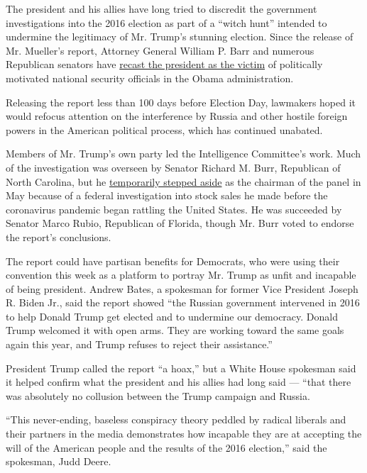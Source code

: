 The president and his allies have long tried to discredit the government
investigations into the 2016 election as part of a ``witch hunt''
intended to undermine the legitimacy of Mr. Trump's stunning election.
Since the release of Mr. Mueller's report, Attorney General William P.
Barr and numerous Republican senators have
\href{https://www.nytimes3xbfgragh.onion/2020/06/04/us/politics/republicans-senate-trump-russia.html}{recast
the president as the victim} of politically motivated national security
officials in the Obama administration.

Releasing the report less than 100 days before Election Day, lawmakers
hoped it would refocus attention on the interference by Russia and other
hostile foreign powers in the American political process, which has
continued unabated.

Members of Mr. Trump's own party led the Intelligence Committee's work.
Much of the investigation was overseen by Senator Richard M. Burr,
Republican of North Carolina, but he
\href{https://www.nytimes3xbfgragh.onion/2020/05/14/us/politics/richard-burr-stocks.html}{temporarily
stepped aside} as the chairman of the panel in May because of a federal
investigation into stock sales he made before the coronavirus pandemic
began rattling the United States. He was succeeded by Senator Marco
Rubio, Republican of Florida, though Mr. Burr voted to endorse the
report's conclusions.

The report could have partisan benefits for Democrats, who were using
their convention this week as a platform to portray Mr. Trump as unfit
and incapable of being president. Andrew Bates, a spokesman for former
Vice President Joseph R. Biden Jr., said the report showed ``the Russian
government intervened in 2016 to help Donald Trump get elected and to
undermine our democracy. Donald Trump welcomed it with open arms. They
are working toward the same goals again this year, and Trump refuses to
reject their assistance.''

President Trump called the report ``a hoax,'' but a White House
spokesman said it helped confirm what the president and his allies had
long said --- ``that there was absolutely no collusion between the Trump
campaign and Russia.

``This never-ending, baseless conspiracy theory peddled by radical
liberals and their partners in the media demonstrates how incapable they
are at accepting the will of the American people and the results of the
2016 election,'' said the spokesman, Judd Deere.

